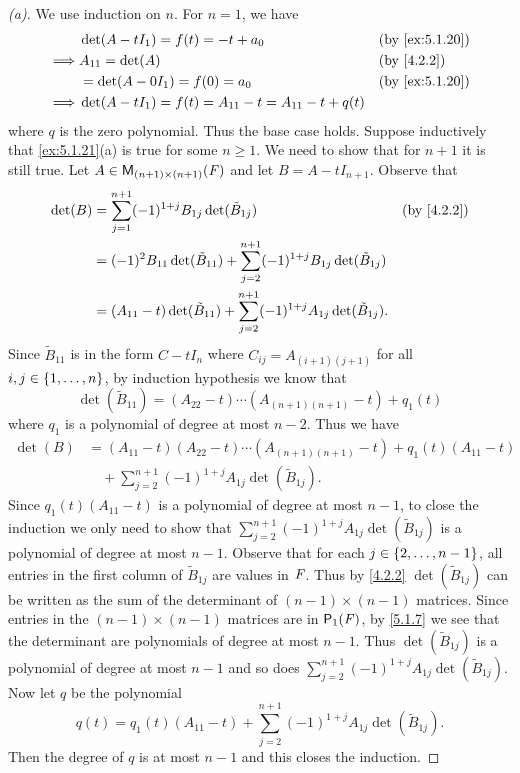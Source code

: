 \begin{proof}[(a)]
	We use induction on \(n\).
	For \(n = 1\), we have
	\begin{align*}
		         & \det(A - t I_1) = f(t) = -t + a_0                         &  & \by{ex:5.1.20} \\
		\implies & A_{1 1} = \det(A)                                         &  & \by{4.2.2}     \\
		         & = \det(A - 0 I_1) = f(0) = a_0                            &  & \by{ex:5.1.20} \\
		\implies & \det(A - t I_1) = f(t) = A_{1 1} - t = A_{1 1} - t + q(t)
	\end{align*}
	where \(q\) is the zero polynomial.
	Thus the base case holds.
	Suppose inductively that \cref{ex:5.1.21}(a) is true for some \(n \geq 1\).
	We need to show that for \(n + 1\) it is still true.
	Let \(A \in \mathsf{M}_{{(n + 1)} \times (n + 1)}({\mathit{F}})\) and let \(B = A - t I_{n + 1}\).
	Observe that
	\begin{align*}
		\det(B) & = \sum_{j = 1}^{n + 1} (-1)^{1 + j} B_{1 j} \det(\tilde{B}_{1 j})                                          &  & \by{4.2.2} \\
		        & = (-1)^{2} B_{1 1} \det(\tilde{B}_{1 1}) + \sum_{j = 2}^{n + 1} (-1)^{1 + j} B_{1 j} \det(\tilde{B}_{1 j})                 \\
		        & = (A_{1 1} - t) \det(\tilde{B}_{1 1}) + \sum_{j = 2}^{n + 1} (-1)^{1 + j} A_{1 j} \det(\tilde{B}_{1 j}).
	\end{align*}
	Since \(\tilde{B}_{1 1}\) is in the form \(C - t I_n\) where \(C_{i j} = A_{(i + 1) (j + 1)}\) for all \(i, j \in \left\lbrace1, \dots, n\right\rbrace\), by induction hypothesis we know that
	\[
		\det(\tilde{B}_{1 1}) = (A_{2 2} - t) \cdots (A_{(n + 1) (n + 1)} - t) + q_1(t)
	\]
	where \(q_1\) is a polynomial of degree at most \(n - 2\).
	Thus we have
	\begin{align*}
		\det(B) & = (A_{1 1} - t) (A_{2 2} - t) \cdots (A_{(n + 1) (n + 1)} - t) + q_1(t) (A_{1 1} - t) \\
		        & \quad + \sum_{j = 2}^{n + 1} (-1)^{1 + j} A_{1 j} \det(\tilde{B}_{1 j}).
	\end{align*}
	Since \(q_1(t) (A_{1 1} - t)\) is a polynomial of degree at most \(n - 1\),  to close the induction we only need to show that \(\sum_{j = 2}^{n + 1} (-1)^{1 + j} A_{1 j} \det(\tilde{B}_{1 j})\) is a polynomial of degree at most \(n - 1\).
	Observe that for each \(j \in \left\lbrace2, \dots, n - 1\right\rbrace\), all entries in the first column of \(\tilde{B}_{1 j}\) are values in \(\mathit{F}\).
	Thus by \cref{4.2.2} \(\det(\tilde{B}_{1 j})\) can be written as the sum of the determinant of \((n - 1) \times (n - 1)\) matrices.
	Since entries in the \((n - 1) \times (n - 1)\) matrices are in \(\ps[1]{\F}\), by \cref{5.1.7} we see that the determinant are polynomials of degree at most \(n - 1\).
	Thus \(\det(\tilde{B}_{1 j})\) is a polynomial of degree at most \(n - 1\) and so does \(\sum_{j = 2}^{n + 1} (-1)^{1 + j} A_{1 j} \det(\tilde{B}_{1 j})\).
	Now let \(q\) be the polynomial
	\[
		q(t) = q_1(t) (A_{1 1} - t) + \sum_{j = 2}^{n + 1} (-1)^{1 + j} A_{1 j} \det(\tilde{B}_{1 j}).
	\]
	Then the degree of \(q\) is at most \(n - 1\) and this closes the induction.
\end{proof}

